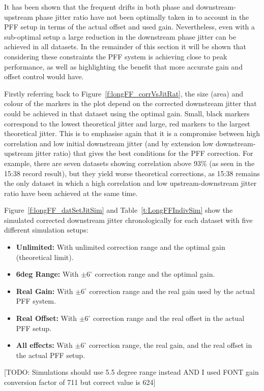 It has been shown that the frequent drifts in both phase and downstream-upstream phase jitter ratio have not been optimally taken in to account in the PFF setup in terms of the actual offset and used gain. Nevertheless, even with a sub-optimal setup a large reduction in the downstream phase jitter can be achieved in all datasets. In the remainder of this section it will be shown that considering these constraints the PFF system is achieving close to peak performance, as well as highlighting the benefit that more accurate gain and offset control would have.

Firstly referring back to Figure~\ref{f:longFF_corrVsJitRat}, the size (area) and colour of the markers in the plot depend on the corrected downstream jitter that could be achieved in that dataset using the optimal gain. Small, black markers correspond to the lowest theoretical jitter and large, red markers to the largest theoretical jitter. This is to emphasise again that it is a compromise between high correlation and low initial downstream jitter (and by extension low downstream-upstream jitter ratio) that gives the best conditions for the PFF correction. For example, there are seven datasets showing correlation above 93\% (as seen in the 15:38 record result), but they yield worse theoretical corrections, as 15:38 remains the only dataset in which a high correlation and low upstream-downstream jitter ratio have been achieved at the same time.

Figure~\ref{f:longFF_datSetJitSim} and Table~\ref{t:LongFFIndivSim} show the simulated corrected downstream jitter chronologically for each dataset with five different simulation setups:
\begin{itemize}
\item \textbf{Unlimited:} With unlimited correction range and the optimal gain (theoretical limit).
\item \textbf{6deg Range:} With \(\pm6^\circ\) correction range and the optimal gain.
\item \textbf{Real Gain:} With \(\pm6^\circ\) correction range and the real gain used by the actual PFF system.
\item \textbf{Real Offset:} With \(\pm6^\circ\) correction range and the real offset in the actual PFF setup.
\item \textbf{All effects:} With \(\pm6^\circ\) correction range, the real gain, and the real offset in the actual PFF setup.
\end{itemize}

[TODO: Simulations should use 5.5 degree range instead AND I used FONT gain conversion factor of 711 but correct value is 624]

